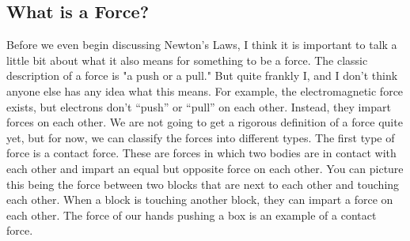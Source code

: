 \documentclass{article}[gray]
\numberwithin{equation}{subsection}
\begin{document}
\subsection{What is a Force?}

Before we even begin discussing Newton’s Laws, I think it is important to talk a little bit about what it also means for something to be a force. The classic description of a force is "a push or a pull." But quite frankly I, and I don't think anyone else has any idea what this means. For example, the electromagnetic force exists, but electrons don’t “push” or “pull” on each other. Instead, they impart forces on each other. We are not going to get a rigorous definition of a force quite yet, but for now, we can classify the forces into different types. The first type of force is a contact force. These are forces in which two bodies are in contact with each other and impart an equal but opposite force on each other. You can picture this being the force between two blocks that are next to each other and touching each other. When a block is touching another block, they can impart a force on each other. The force of our hands pushing a box is an example of a contact force. 
\end{document}

